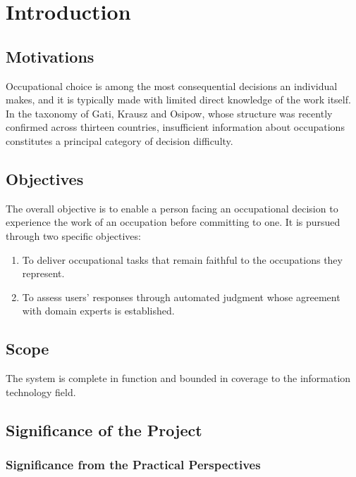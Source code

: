 \newpage
\section{Introduction}

\subsection{Motivations}

Occupational choice is among the most consequential decisions an individual makes, and it is typically made with limited direct knowledge of the work itself. In the taxonomy of Gati, Krausz and Osipow\cite{r1}, whose structure was recently confirmed across thirteen countries\cite{r2}, insufficient information about occupations constitutes a principal category of decision difficulty.

\subsection{Objectives}

The overall objective is to enable a person facing an occupational decision to experience the work of an occupation before committing to one. It is pursued through two specific objectives:

\begin{enumerate}[leftmargin=1.5em]
  \item To deliver occupational tasks that remain faithful to the occupations they represent.
  \item To assess users' responses through automated judgment whose agreement with domain experts is established.
\end{enumerate}

\subsection{Scope}

The system is complete in function and bounded in coverage to the information technology field.

\subsection{Significance of the Project}

\subsubsection{Significance from the Practical Perspectives}

